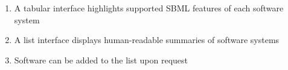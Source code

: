 \documentclass{sbml-paper}
\newcounter{mybox}
\newcommand{\mybox}[1]{%
   \refstepcounter{mybox}%
   \noindent\textbf{\Large \rule{1cm}{0.4pt}~Box~\themybox{}. #1~\hrulefill}%
}%
\begin{document}
\begin{minipage}{\textwidth}
\begin{minipage}{6.25in}
\begin{enumerate}
    \item A tabular interface highlights supported SBML features of each software system

    \item A list interface displays human-readable summaries of software systems

    \item Software can be added to the list upon request

    \end{enumerate}
  \end{minipage}
\end{minipage}





\end{document}
